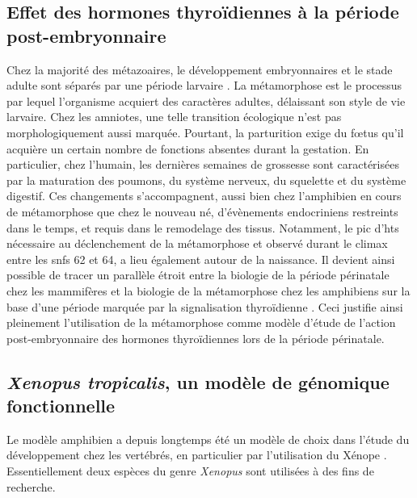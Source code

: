 \documentclass[../main.tex]{subfiles}
\begin{document}

	\subsection{Effet des hormones thyroïdiennes à la période post-embryonnaire}
		Chez la majorité des métazoaires, le développement embryonnaires et le stade adulte sont séparés par une période larvaire \citep{Laudet2011b,Holstein2014}.
		La métamorphose est le processus par lequel l'organisme acquiert des caractères adultes, délaissant son style de vie larvaire.
		Chez les amniotes, une telle transition écologique n'est pas morphologiquement aussi marquée.
		Pourtant, la parturition exige du fœtus qu'il acquière un certain nombre de fonctions absentes durant la gestation.
		En particulier, chez l'humain, les dernières semaines de grossesse sont caractérisées par la maturation des poumons, du système nerveux, du squelette et du système digestif.
		Ces changements s'accompagnent, aussi bien chez l'amphibien en cours de métamorphose que chez le nouveau né, d’évènements endocriniens restreints dans le temps, et requis dans le remodelage des tissus.
		Notamment, le pic d'\glspl{ht} nécessaire au déclenchement de la métamorphose et observé durant le climax entre les \glspl{snf} 62 et 64, a lieu également autour de la naissance.
		Il devient ainsi possible de tracer un parallèle étroit entre la biologie de la période périnatale chez les mammifères et la biologie de la métamorphose chez les amphibiens sur la base d'une période marquée par la signalisation thyroïdienne \citep{Laudet2011b}.
		Ceci justifie ainsi pleinement l'utilisation de la métamorphose comme modèle d'étude de l'action post-embryonnaire des hormones thyroïdiennes lors de la période périnatale.


	\subsection{\textit{Xenopus tropicalis}, un modèle de génomique fonctionnelle}\label{subsec:xtrop-model}
		Le modèle amphibien a depuis longtemps été un modèle de choix dans l'étude du développement chez les vertébrés, en particulier par l'utilisation du Xénope \citep{Harland2011}.
		Essentiellement deux espèces du genre \textit{Xenopus} sont utilisées à des fins de recherche.
\end{document}
